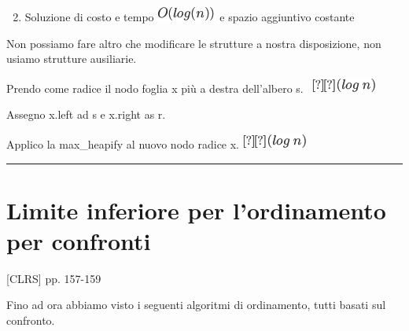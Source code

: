 \documentclass{article}
\providecommand{\tightlist}{%
  \setlength{\itemsep}{0pt}\setlength{\parskip}{0pt}}
\begin{document}
{}

\begin{enumerate}
\setcounter{enumi}{1}
\tightlist
\item
  {Soluzione di costo e tempo }\includegraphics{images/image144.png}{~e
  spazio aggiuntivo costante}
\end{enumerate}

{Non possiamo fare altro che modificare le strutture a nostra
disposizione, non usiamo strutture ausiliarie.}

{}

{Prendo come radice il nodo foglia x più a destra dell'albero s.
~}\includegraphics{images/image150.png}

{Assegno x.left ad s e x.right as r.}

{Applico la max\_heapify al nuovo nodo radice x.
}\includegraphics{images/image150.png}

\begin{center}\rule{0.5\linewidth}{\linethickness}\end{center}

{}

\hypertarget{h.7gslm72cwwxs}{\section{\texorpdfstring{{Limite inferiore
per l'ordinamento per
confronti}}{Limite inferiore per l'ordinamento per confronti}}\label{h.7gslm72cwwxs}}

{{[}CLRS{]} pp. 157-159}

{}

{Fino ad ora abbiamo visto i seguenti algoritmi di ordinamento, tutti
basati sul confronto.}

{}

\protect\hypertarget{t.d27200ce3c3d6e65597fb549126b470657d85de0}{}{}\protect\hypertarget{t.26}{}{}
\end{document}
